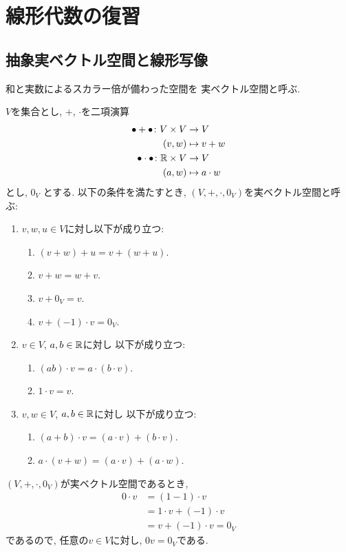 
\chapter{線形代数の復習}

\section{抽象実ベクトル空間と線形写像}
和と実数によるスカラー倍が備わった空間を
実ベクトル空間と呼ぶ.
\begin{definition}
  $V$を集合とし,
  $+$, $\cdot$を二項演算
  \begin{align*}
    \bullet + \bullet \colon V\times V &\to V\\
    (v,w)&\mapsto v+w\\
    \bullet \cdot \bullet \colon \mathbb{R}\times V &\to V\\
    (a,w)&\mapsto a\cdot w
  \end{align*}
  とし,
  $0_V$
  とする.
  以下の条件を満たすとき,
  $(V,+,\cdot,0_V)$を実ベクトル空間と呼ぶ:
  \begin{enumerate}
  \item $v,w,u\in V$に対し以下が成り立つ:
    \begin{enumerate}
    \item $(v+w)+u=v+(w+u)$.
    \item $v+w=w+v$.
    \item $v+0_V=v$.
    \item $v+(-1)\cdot v=0_V$.
    \end{enumerate}
  \item $v\in V$, $a,b\in\mathbb{R}$に対し
    以下が成り立つ:
    \begin{enumerate}
    \item $(ab)\cdot v=a\cdot (b\cdot v)$.
    \item $1\cdot v=v$.
    \end{enumerate}      
  \item $v,w \in V$, $a,b\in\mathbb{R}$に対し
    以下が成り立つ:
    \begin{enumerate}
    \item $(a+b)\cdot v=(a\cdot v) + (b\cdot v)$.
    \item $a\cdot (v+w)=(a\cdot v) + (a\cdot w)$.
    \end{enumerate}      
  \end{enumerate}
\end{definition}
\begin{remark}
  $(V,+,\cdot,0_V)$が実ベクトル空間であるとき,
  \begin{align*}
    0\cdot v
    &=(1-1)\cdot v\\
    &=1\cdot v + (-1)\cdot v\\
    &=v+ (-1)\cdot v= 0_V
  \end{align*}
  であるので,
  任意の$v\in V$に対し, $0v=0_V$である.
\end{remark}
